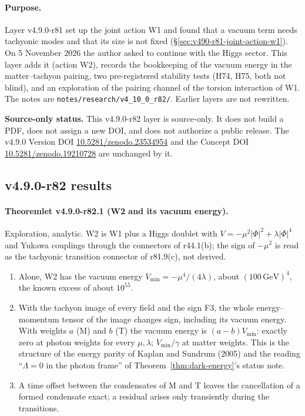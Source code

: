 \paragraph{Purpose.}
Layer v4.9.0-r81 set up the joint action W1 and found that a vacuum term needs tachyonic modes and that its size is not fixed
(\S\ref{sec:v490-r81-joint-action-w1}).  On 5 November 2026 the author asked to continue with the Higgs sector.  This layer adds it
(action W2), records the bookkeeping of the vacuum energy in the matter--tachyon pairing, two pre-registered stability tests (H74,
H75, both not blind), and an exploration of the pairing channel of the torsion interaction of W1.  The notes are
\texttt{notes/\allowbreak research/\allowbreak v4\_10\_0\_r82/}.  Earlier layers are not rewritten.

\noindent\textbf{Source-only status.}
This v4.9.0-r82 layer is source-only.  It does not build a PDF, does not assign a new DOI,
and does not authorize a public release.  The v4.9.0 Version DOI
\href{https://doi.org/10.5281/zenodo.23534954}{10.5281/zenodo.23534954} and the Concept DOI
\href{https://doi.org/10.5281/zenodo.19210728}{10.5281/zenodo.19210728} are unchanged by it.

\subsection*{v4.9.0-r82 results}
\label{subsec:v490-r82-results}

\paragraph{Theoremlet v4.9.0-r82.1 (W2 and its vacuum energy).}
Exploration, analytic.  W2 is W1 plus a Higgs doublet with \(V=-\mu^2|\Phi|^2+\lambda|\Phi|^4\) and Yukawa couplings through the
connectors of r44.1(b); the sign of \(-\mu^2\) is read as the tachyonic transition connector of r81.9(c), not derived.
\begin{enumerate}[leftmargin=2em]
\item[(a)] Alone, W2 has the vacuum energy \(V_{\min}=-\mu^4/(4\lambda)\), about \((100\,\mathrm{GeV})^4\), the known excess of about \(10^{55}\).
\item[(b)] With the tachyon image of every field and the sign F3, the whole energy--momentum tensor of the image changes sign,
including its vacuum energy.  With weights \(a\) (M) and \(b\) (T) the vacuum energy is \((a-b)V_{\min}\): exactly zero at photon
weights for every \(\mu,\lambda\); \(V_{\min}/\gamma\) at matter weights.  This is the structure of the energy parity of Kaplan and
Sundrum (2005) and the reading ``\(\Lambda=0\) in the photon frame'' of Theorem~\ref{thm:dark-energy}'s status note.
\item[(c)] A time offset between the condensates of M and T leaves the cancellation of a formed condensate exact; a residual
arises only transiently during the transitions.
\end{enumerate}

